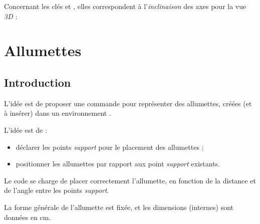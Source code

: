 \begin{tipblock}
Concernant les clés  et , elles correspondent à l'\textit{inclinaison} des axes pour la vue \textit{3D} :

\begin{center}
\end{center}
\end{tipblock}



\begin{PresCodeTexPL}{}
\end{PresCodeTexPL}

\pagebreak

\section{Allumettes}\label{allumettes}

\subsection{Introduction}

\begin{tipblock}
 L'idée est de proposer une commande pour représenter des allumettes, créées (et à insérer) dans un environnement .

\smallskip

L'idée est de :

\begin{itemize}
	\item déclarer les points \textit{support} pour le placement des allumettes ;
	\item positionner les allumettes par rapport aux point \textit{support} existants.
\end{itemize}

Le code se charge de placer correctement l'allumette, en fonction de la distance et de l'angle entre les points \textit{support}.

\smallskip

La forme générale de l'allumette est fixée, et les dimensions (internes) sont données en cm.
\end{tipblock}

